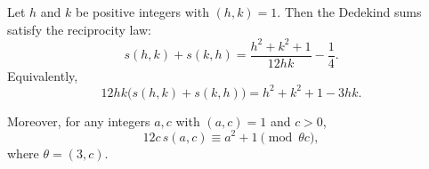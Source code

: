 Let $h$ and $k$ be positive integers with $(h, k) = 1$. Then the Dedekind sums satisfy the reciprocity law:
$$s(h, k) + s(k, h) = \frac{h^2 + k^2 + 1}{12hk} - \frac{1}{4}.$$
Equivalently,
$$12hk\bigl(s(h, k) + s(k, h)\bigr) = h^2 + k^2 + 1 - 3hk.$$

Moreover, for any integers $a, c$ with $(a, c) = 1$ and $c > 0$,
$$12c\,s(a, c) \equiv a^2 + 1 \pmod{\theta c},$$
where $\theta = (3, c)$.
